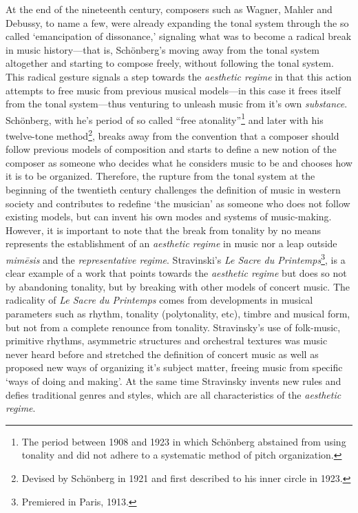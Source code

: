At the end of the nineteenth century, composers such as Wagner, Mahler and Debussy, to name a few, were already expanding the tonal system through the so called `emancipation of dissonance,' signaling what was to become a radical break in music history---that is, Sch\"{o}nberg's moving away from the tonal system altogether and starting to compose freely, without following the tonal system. This radical gesture signals a step towards the \emph{aesthetic regime} in that this action attempts to free music from previous musical models---in this case it frees itself from the tonal system---thus venturing to unleash music from it's own \emph{substance}. Sch\"{o}nberg, with he's period of so called ``free atonality''\footnote{The period between 1908 and 1923 in which Sch\"{o}nberg abstained from using tonality and did not adhere to a systematic method of pitch organization.} and later with his twelve-tone method\footnote{Devised by Sch\"{o}nberg in 1921 and first described to his inner circle in 1923.}, breaks away from the convention that a composer should follow previous models of composition and starts to define a new notion of the composer as someone who decides what he considers music to be and chooses how it is to be organized. Therefore, the rupture from the tonal system at the beginning of the twentieth century challenges the definition of music in western society and contributes to redefine `the musician' as someone who does not follow existing models, but can invent his own modes and systems of music-making. However, it is important to note that the break from tonality by no means represents the establishment of an \emph{aesthetic regime} in music nor a leap outside \emph{mim\={e}sis} and the \emph{representative regime}.  Stravinski's \emph{Le Sacre du Printemps}\footnote{Premiered in Paris, 1913.}, is a clear example of a work that points towards the \emph{aesthetic regime} but does so not by abandoning tonality, but by breaking with other models of concert music. The radicality of \emph{Le Sacre du Printemps} comes from developments in musical parameters such as rhythm, tonality (polytonality, etc), timbre and musical form, but not from a complete renounce from tonality. Stravinsky's use of folk-music, primitive rhythms, asymmetric structures and orchestral textures was music never heard before and stretched the definition of concert music as well as proposed new ways of organizing it's subject matter, freeing music from specific `ways of doing and making'. At the same time Stravinsky invents new rules and defies traditional genres and styles, which are all characteristics of the \emph{aesthetic regime}. 

